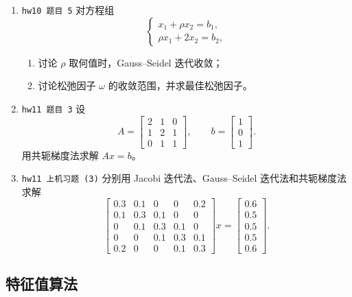 \documentclass{article}
\begin{document}
\begin{enumerate}
  \item \texttt{hw10 题目 5} 对方程组
  \[
    \begin{cases}
      x_1+\rho x_2=b_1,\\
      \rho x_1+2x_2=b_2,
    \end{cases}
  \]
  \begin{enumerate}[(1)]
    \item 讨论 $\rho$ 取何值时，Gauss--Seidel 迭代收敛；
    \item 讨论松弛因子 $\omega$ 的收敛范围，并求最佳松弛因子。
  \end{enumerate}

  \item \texttt{hw11 题目 3} 设
  \[
    A=
    \begin{bmatrix}
      2&1&0\\
      1&2&1\\
      0&1&1
    \end{bmatrix},\qquad
    b=\begin{bmatrix}1\\0\\1\end{bmatrix}.
  \]
  用共轭梯度法求解 $Ax=b$。

  \item \texttt{hw11 上机习题 (3)} 分别用 Jacobi 迭代法、Gauss--Seidel 迭代法和共轭梯度法求解
  \[
    \begin{bmatrix}
      0.3&0.1&0&0&0.2\\
      0.1&0.3&0.1&0&0\\
      0&0.1&0.3&0.1&0\\
      0&0&0.1&0.3&0.1\\
      0.2&0&0&0.1&0.3
    \end{bmatrix}
    x
    =
    \begin{bmatrix}0.6\\0.5\\0.5\\0.5\\0.6\end{bmatrix}.
  \]
\end{enumerate}

\subsection{特征值算法}
\end{document}
